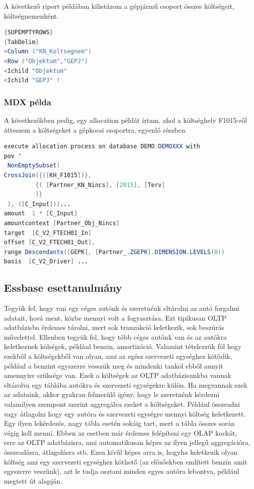 A következő riport példában kilistázom a gépjármű csoport összes költségeit, költségnemenként.

\begin{lstlisting}[language=java,morekeywords={dim,group,row,link,reportParameter,report,query},alsoletter={-},breaklines=true]
{SUPEMPTYROWS} 
{TabDelim} 
<Column ("KN_Koltsegnem")  
<Row ("Objektum","GEPJ")  
<Ichild "Objektum"  
<Ichild "GEPJ" !
\end{lstlisting}

\subsubsection{MDX példa}

A következőkben pedig, egy allocation példát írtam, ahol a költséghely F1015-ről átteszem a költségeket a gépkocsi csoportra, egyenlő részben.

\begin{lstlisting}[language=java,morekeywords={dim,group,row,link,reportParameter,report,query},alsoletter={-},breaklines=true]
execute allocation process on database DEMO.DEMOXXX with
pov '
 NonEmptySubset(
CrossJoin({([KH_F1015])},
         {( [Partner_KN_Nincs], [2015], [Terv]
         )}
 ), ([C_Input]))...
amount  1 * [C_Input]
amountcontext [Partner_Obj_Nincs]
target  [C_V2_FTECH01_In]
offset [C_V2_FTECH01_Out],
range Descendants([GEPK], [Partner_.ZGEPK].DIMENSION.LEVELS(0))
basis  [C_V2_Driver] ...
\end{lstlisting}


\subsection{Essbase esettanulmány}
Tegyük fel, hogy van egy céges autónk és szeretnénk eltárolni az autó forgalmi adatait, hová ment, közbe mennyi volt a fogyasztása. Ezt tipikusan OLTP adatbázisba érdemes tárolni, mert sok tranzakció keletkezik, sok beszúrás művelettel. Ellenben tegyük fel, hogy több céges autónk van és az autókra keletkeznek kölségek, például benzin, amortizáció. Valamint tételezzük föl hogy ezekből a költségekből van olyan, ami az egész szervezeti egységhez kötődik, például a benzint egyszerre vesszük meg és mindenki tankol ebből annyit amennyire szüksége van. Ezek a költségek az OLTP adatbázisunkba vannak eltárolva egy táblába autókra és szervezeti egységekre külön. Ha megvannak ezek az adataink, akkor gyakran felmerülő igény, hogy le szeretnénk kérdezni valamilyen szempont szerint aggregálva ezeket a költségeket. Például összeadni vagy átlagolni hogy egy autóra és szervezeti egységre mennyi költség keletkezett. Egy ilyen lekérdezés, nagy tábla esetén sokáig tart, mert a tábla összes során végig kell menni.  Ebben az esetben már érdemes felépíteni egy OLAP kockát, erre az OLTP adatbázisra, ami automatikusan képes az ilyen jellegű aggregációra, összeadásra, átlagolásra stb. Ezen kívűl képes arra is, hogyha keletkezik olyan költség ami egy szervezeti egységhez köthető (az előzőekben említett benzin amit egyszerre veszünk), azt le tudja osztani minden egyes autóra lebontva, például megtett út alapján.

